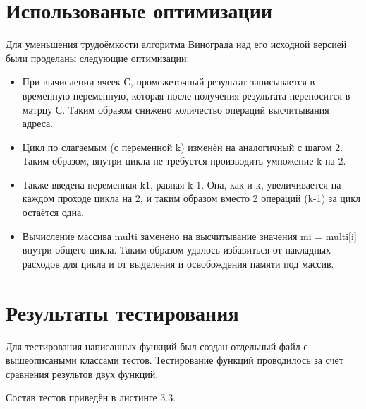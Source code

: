 \section{Использованые оптимизации}
Для уменьшения трудоёмкости алгоритма Винограда над его исходной версией были проделаны следующие оптимизации:
\begin{itemize}
	\item При вычислении ячеек С, промежеточный результат записывается в временную переменную, которая после получения результата переносится в матрцу С. Таким образом снижено количество операций высчитывания адреса.
	\item Цикл по слагаемым (с переменной k) изменён на аналогичный с шагом 2. Таким образом, внутри цикла не требуется производить умножение k на 2.
	\item Также введена переменная k1, равная k-1. Она, как и k, увеличивается на каждом проходе цикла на 2, и таким образом вместо 2 операций (k-1) за цикл остаётся одна.
	\item Вычисление массива multi заменено на высчитывание значения mi = multi[i] внутри общего цикла. Таким образом удалось избавиться от накладных расходов для цикла и от выделения и освобождения памяти под массив.
\end{itemize}

\section{Результаты тестирования}
Для тестирования написанных функций был создан отдельный файл с вышеописаными классами тестов. Тестирование функций проводилось за счёт сравнения результов двух функций.

Состав тестов приведён в листинге 3.3.

